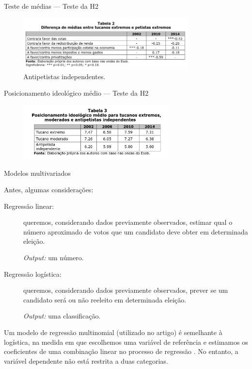 \documentclass[9pt]{beamer}
\begin{document}
\begin{frame}{Teste de médias --- Teste da H2}
    \begin{figure}[h]
        \includegraphics[width=9cm]{images/teste de medias.png}
        \caption{Antipetistas independentes.}
    \end{figure}
\end{frame}

\begin{frame}{Posicionamento ideológico médio --- Teste da H2}
    \begin{figure}[h]
        \includegraphics[width=8cm]{images/posicionamento ideologico medio.png}
    \end{figure}
\end{frame}

\begin{frame}{Modelos multivariados}

Antes, algumas considerações:

\begin{description}
    \item[Regressão linear:] queremos, considerando dados previamente observados, estimar qual o número aproximado de votos que um candidato deve obter em determinada eleição.

    \textit{Output:} um número.
    
    \item[Regressão logística:] queremos, considerando dados previamente observados, prever se um candidato será ou não reeleito em determinada eleição.

    \textit{Output:} uma classificação.
\end{description}

Um modelo de regressão multinomial (utilizado no artigo) é semelhante à logística, na medida em que escolhemos uma variável de referência e estimamos os coeficientes de uma combinação linear no processo de regressão \cite{kellstedt_whitten}. No entanto, a variável dependente não está restrita a duas categorias.

\end{frame}
\end{document}
